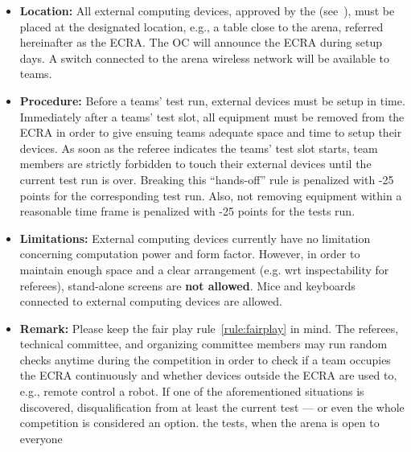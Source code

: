 \begin{itemize}
  \item \textbf{Location:} All external computing devices, approved by the 
  		(see~), must be placed at the designated location, e.g., a table close
        to the arena, referred hereinafter as the  {ECRA}. The OC will announce the ECRA during setup days. A switch connected to the arena
        wireless network will be available to teams.
  \item \textbf{Procedure:} Before a teams' test run, external devices must be setup in time.
  		Immediately after a teams' test slot, all equipment must be removed from the ECRA in order to give ensuing
        teams adequate space and time to setup their devices. As soon as the referee indicates the teams' test slot
        starts, team members are strictly forbidden to touch their external devices until the current test run is over.
        Breaking this ``hands-off'' rule is penalized with -25 points for the corresponding test run. Also, not removing
        equipment within a reasonable time frame is penalized with -25 points for the tests run.
  \item \textbf{Limitations:} External computing devices currently have no limitation concerning computation
  		power and form factor. However, in order to maintain enough space and a	clear arrangement (e.g. wrt
        inspectability for referees), stand-alone screens are \textbf{not allowed}. Mice and keyboards connected
        to external computing devices are allowed.
  \item \textbf{Remark:} Please keep the fair play rule~\ref{rule:fairplay} in mind. The referees, technical committee,
        and organizing committee members may run random checks anytime during the competition in order to check if a team
        occupies the ECRA continuously and whether devices outside the ECRA are used to, e.g., remote control a robot.
        If one of the aforementioned situations is discovered, disqualification from at least the current test --- or
        even the whole competition is considered an option. %
        the tests, when the arena is open to everyone
\end{itemize}


